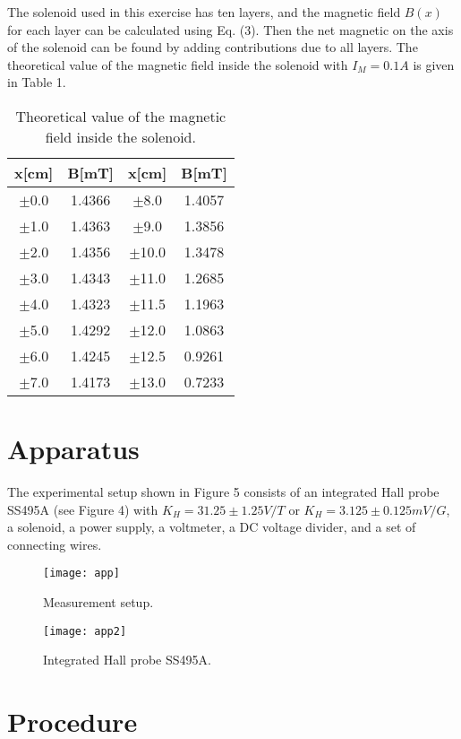 \documentclass[a4paper,12pt]{article}
\begin{document}
The solenoid used in this exercise has ten layers, and the magnetic field $ B(x) $ for each layer can be calculated using Eq. (3). Then the net magnetic on the axis of the solenoid can be found by adding contributions due to all layers. The theoretical value of the magnetic field inside the solenoid with $ I_M = 0.1 A $ is given in Table 1.
\begin{table}[H]
	\centering
	\begin{tabular}{cc||cc}
		\toprule
		x[cm]     & B[mT]      &    x[cm]   & B[mT] \\
		\midrule
		$ \pm $0.0     & 1.4366  & $\pm$8.0     & 1.4057  \\
		$\pm$1.0     & 1.4363  & $\pm$9.0     & 1.3856  \\
		$\pm$2.0     & 1.4356  & $\pm$10.0    & 1.3478  \\
		$\pm$3.0     & 1.4343  & $\pm$11.0    & 1.2685  \\
		$\pm$4.0     & 1.4323  & $\pm$11.5  & 1.1963  \\
		$\pm$5.0     & 1.4292  & $\pm$12.0    & 1.0863  \\
		$\pm$6.0     & 1.4245  & $\pm$12.5  & 0.9261  \\
		$\pm$7.0     & 1.4173  & $\pm$13.0    & 0.7233  \\
		\bottomrule
	\end{tabular}%
	\caption{Theoretical value of the magnetic field inside the solenoid.}
\end{table}%
\section{Apparatus}
The experimental setup shown in Figure 5 consists of an integrated Hall probe SS495A (see Figure 4) with $ K_H = 31.25 \pm 1.25 V/T $ or $ K_H = 3.125 \pm 0.125 mV/G $, a solenoid, a power supply, a voltmeter, a DC voltage divider, and a set of connecting wires.
\begin{figure}[H]
	\centering
	\texttt{[image: app]}
	\caption{Measurement setup.}
\end{figure}
\begin{figure}[H]
	\centering
	\texttt{[image: app2]}
	\caption{Integrated Hall probe SS495A.}
\end{figure}
\section{Procedure}
\end{document}
